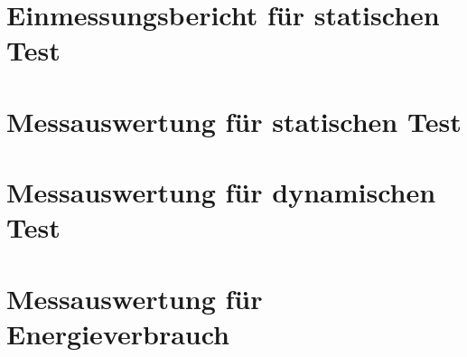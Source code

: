 \chapter{Einmessungsbericht für statischen Test\label{appendix:einmessbericht}}

\chapter{Messauswertung für statischen Test\label{appendix:static_test}}

\chapter{Messauswertung für dynamischen Test\label{appendix:dynamic_test}}

\chapter{Messauswertung für Energieverbrauch\label{appendix:power_test}}
